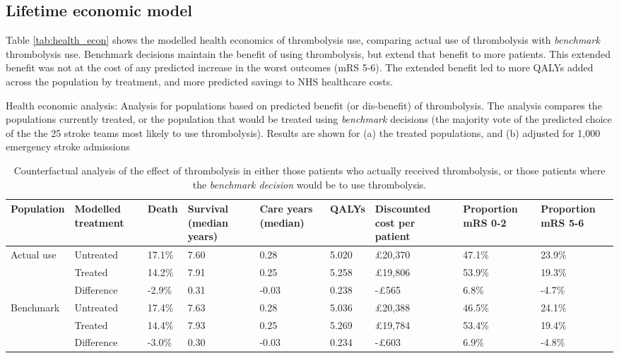 \subsection{Lifetime economic model}

Table \ref{tab:health_econ} shows the modelled health economics of thrombolysis use, comparing actual use of thrombolysis with \textit{benchmark} thrombolysis use. Benchmark decisions maintain the benefit of using thrombolysis, but extend that benefit to more patients. This extended benefit was not at the cost of any predicted increase in the worst outcomes (mRS 5-6). The extended benefit led to more QALYs added across the population by treatment, and more predicted savings to NHS healthcare costs.

\begin{table}[!h]
\small
\caption{Health economic analysis: Analysis for  populations based on predicted benefit (or dis-benefit) of thrombolysis. The analysis compares the populations currently treated, or the population that would be treated using \textit{benchmark} decisions (the majority vote of the predicted choice of the the 25 stroke teams most likely to use thrombolysis). Results are shown for (a) the treated populations, and (b) adjusted for 1,000 emergency stroke admissions }
\label{tab:main}

\begin{subtable}{1\textwidth}
\centering
\caption{Counterfactual analysis of the effect of thrombolysis in either those patients who actually received thrombolysis, or those patients where the \textit{benchmark decision} would be to use thrombolysis.}
\begin{tabular}{p{2.0cm} p{1.5cm} p{1.2cm} p{1.3cm} p{1.5cm} p{1.3cm} p{1.4cm} p{1.3cm} p{1.3cm}}
\toprule
Population & \raggedright Modelled treatment & Death & Survival (median years) & Care years (median) & QALYs & \raggedright Discounted cost per patient & Proportion mRS 0-2 & Proportion mRS 5-6\tabularnewline
\midrule
Actual use & Untreated & 17.1\% & 7.60 & 0.28 & 5.020 & £20,370 & 47.1\% & 23.9\%\tabularnewline
& Treated & 14.2\% & 7.91 & 0.25 & 5.258 & £19,806 & 53.9\% & 19.3\%\tabularnewline
& Difference & -2.9\% & 0.31 & -0.03 & 0.238 & -£565 & 6.8\% & -4.7\%\tabularnewline
\midrule
Benchmark & Untreated & 17.4\% & 7.63 & 0.28 & 5.036 & £20,388 & 46.5\% & 24.1\%\tabularnewline
& Treated & 14.4\% & 7.93 & 0.25 & 5.269 & £19,784 & 53.4\% & 19.4\%\tabularnewline
& Difference & -3.0\% & 0.30 & -0.03 & 0.234 & -£603 & 6.9\% & -4.8\%\tabularnewline


\end{tabular}
\end{subtable}
\end{table}

